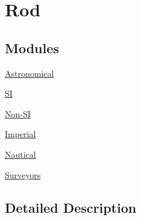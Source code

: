 \hypertarget{group___e_g_x_math-_conversions-_length_conversions-_surveyors-_rod}{}\section{Rod}
\label{group___e_g_x_math-_conversions-_length_conversions-_surveyors-_rod}
\subsection*{Modules}
\begin{DoxyCompactItemize}
\item 
\mbox{\hyperlink{group___e_g_x_math-_conversions-_length_conversions-_surveyors-_rod-_astronomical}{Astronomical}}
\item 
\mbox{\hyperlink{group___e_g_x_math-_conversions-_length_conversions-_surveyors-_rod-_s_i}{SI}}
\item 
\mbox{\hyperlink{group___e_g_x_math-_conversions-_length_conversions-_surveyors-_rod-_non-_s_i}{Non-\/\+SI}}
\item 
\mbox{\hyperlink{group___e_g_x_math-_conversions-_length_conversions-_surveyors-_rod-_imperial}{Imperial}}
\item 
\mbox{\hyperlink{group___e_g_x_math-_conversions-_length_conversions-_surveyors-_rod-_nautical}{Nautical}}
\item 
\mbox{\hyperlink{group___e_g_x_math-_conversions-_length_conversions-_surveyors-_rod-_surveyors}{Surveyors}}
\end{DoxyCompactItemize}


\subsection{Detailed Description}
